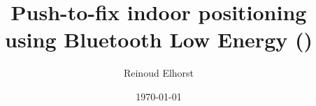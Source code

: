 \documentclass[a4paper, 12pt]{book}
\begin{document}
\title{Push-to-fix indoor positioning using Bluetooth Low Energy ()}
\author{Reinoud Elhorst}
\date{\today}
\maketitle








\end{document}
